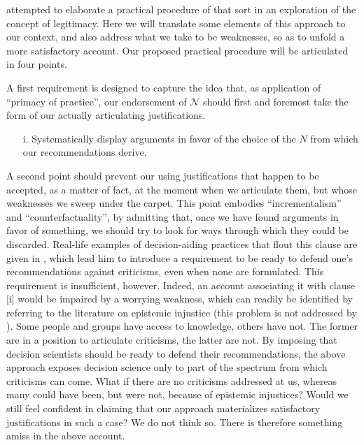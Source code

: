 \documentclass[preprint, french, english, 11pt, authoryear]{elsarticle}%
\newcommand{\adv}{\mathscr{N}}
\begin{document}
\citet{meinard_what_2017} attempted to elaborate a practical procedure of that sort in an exploration of the concept of legitimacy. Here we will translate some elements of this approach to our context, and also address what we take to be weaknesses, so as to unfold a more satisfactory account. Our proposed practical procedure will be articulated in four points.

A first requirement is designed to capture the idea that, as application of “primacy of practice”, our endorsement of $\adv$ should first and foremost take the form of our actually articulating justifications.

\begin{itemize}
\item[i.]	Systematically display arguments in favor of the choice of the $N$ from which our recommendations derive.
\end{itemize}

A second point should prevent our using justifications that happen to be accepted, as a matter of fact, at the moment when we articulate them, but whose weaknesses we sweep under the carpet. This point embodies “incrementalism” and ``counterfactuality'', by admitting that, once we have found arguments in favor of something, we should try to look for ways through which they could be discarded. Real-life examples of decision-aiding practices that flout this clause are given in \cite{meinard_what_2017}, which lead him to introduce a requirement to be ready to defend one's recommendations against criticisms, even when none are formulated. This requirement is insufficient, however. Indeed, an account associating it with clause [i] would be impaired by a worrying weakness, which can readily be identified by referring to the literature on epistemic injustice \citep{fricker_epistemic_2007} (this problem is not addressed by \cite{meinard_what_2017}). Some people and groups have access to knowledge, others have not. The former are in a position to articulate criticisms, the latter are not. By imposing that decision scientists should be ready to defend their recommendations, the above approach exposes decision science only to part of the spectrum from which criticisms can come. What if there are no criticisms addressed at us, whereas many could have been, but were not, because of epistemic injustices? Would we still feel confident in claiming that our approach materializes satisfactory justifications in such a case? We do not think so. There is therefore something amiss in the above account.
\end{document}
